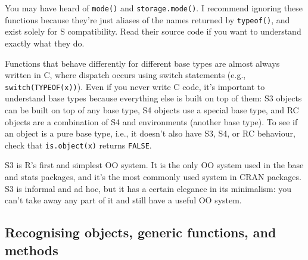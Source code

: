 \begin{Shaded}
\begin{Highlighting}[]
\StringTok{ }

\end{Highlighting}
\end{Shaded}

You may have heard of \texttt{mode()} and \texttt{storage.mode()}. I
recommend ignoring these functions because they're just aliases of the
names returned by \texttt{typeof()}, and exist solely for S
compatibility. Read their source code if you want to understand exactly
what they do. 

Functions that behave differently for different base types are almost
always written in C, where dispatch occurs using switch statements
(e.g., \texttt{switch(TYPEOF(x))}). Even if you never write C code, it's
important to understand base types because everything else is built on
top of them: S3 objects can be built on top of any base type, S4 objects
use a special base type, and RC objects are a combination of S4 and
environments (another base type). To see if an object is a pure base
type, i.e., it doesn't also have S3, S4, or RC behaviour, check that
\texttt{is.object(x)} returns \texttt{FALSE}.


S3 is R's first and simplest OO system. It is the only OO system used in
the base and stats packages, and it's the most commonly used system in
CRAN packages. S3 is informal and ad hoc, but it has a certain elegance
in its minimalism: you can't take away any part of it and still have a
useful OO system.  

\subsection{Recognising objects, generic functions, and methods}

